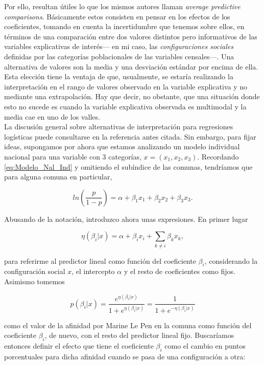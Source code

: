  Por ello, resultan útiles lo que los mismos autores llaman \textit{average predictive comparisons}. Básicamente estos consisten en pensar en los efectos de los coeficientes, tomando en cuenta la incertidumbre que tenemos sobre ellos, en términos de una comparación entre dos valores distintos pero informativos de las variables explicativas de interés--- en mi caso, las \textit{configuraciones sociales} definidas por las categorías poblacionales de las variables censales---. Una alternativa de valores son la media y una desviación estándar por encima de ella. Esta elección tiene la ventaja de que, usualmente, se estaría realizando la interpretación en el rango de valores observado en la variable explicativa y no mediante una extrapolación. Hay que decir, no obstante, que una situación donde esto no sucede es cuando la variable explicativa observada es multimodal y la media cae en uno de los valles.\\ 

La discusión general sobre alternativas de interpretación para regresiones logísticas puede consultarse en la referencia antes citada. Sin embargo, para fijar ideas, supongamos por ahora que estamos analizando un modelo individual nacional para una variable con 3 categorías, $x = (x_1,x_2,x_3)$. Recordando \eqref{eq:Modelo_Nal_Ind} y omitiendo el subíndice de las comunas, tendríamos que para alguna comuna en particular,

\begin{equation*}
ln\left(\dfrac{p}{1-p}\right) = \alpha + \beta_1 x_1 + \beta_2 x_2 + \beta_3 x_3.
\end{equation*}

Abusando de la notación, introduzco ahora unas expresiones. En primer lugar

\begin{equation*}
\eta(\beta_i|x)= \alpha + \beta_i x_i + \sum\limits_{k\neq i} \beta_k x_k, 
\end{equation*} 

para referirme al predictor lineal como función del coeficiente $\beta_i$, considerando la configuración social $x$, el intercepto $\alpha$ y el resto de coeficientes como fijos. Asimismo tomemos 

\begin{equation*}
p(\beta_i|x)=\dfrac{e^{\eta(\beta_i|x)}}{1+e^{\eta(\beta_i|x)}}=\dfrac{1}{1+e^{-\eta(\beta_i|x)}}
\end{equation*} 

como el valor de la afinidad por Marine Le Pen en la comuna como función del coeficiente $\beta_i$, de nuevo, con el resto del predictor lineal fijo. Buscaríamos entonces definir el efecto que tiene el coeficiente $\beta_i$ como el cambio en puntos porcentuales para dicha afinidad cuando se pasa de una configuración a otra: 

